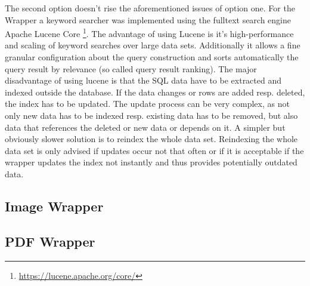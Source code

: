 The second option doesn't rise the aforementioned issues of option one. For the Wrapper a keyword searcher was implemented using the fulltext search engine Apache Lucene Core \footnote{\url{https://lucene.apache.org/core/}}. The advantage of using Lucene is it's high-performance and scaling of keyword searches over large data sets. Additionally it allows a fine granular configuration about the query construction and sorts automatically the query result by relevance (so called query result ranking). The major disadvantage of using lucene is that the SQL data have to be extracted and indexed outside the database. If the data changes or rows are added resp. deleted, the index has to be updated. The update process can be very complex, as not only new data has to be indexed resp. existing data has to be removed, but also data that references the deleted or new data or depends on it. A simpler but obviously slower solution is to reindex the whole data set. Reindexing the whole data set is only advised if updates occur not that often or if it is acceptable if the wrapper updates the index not instantly and thus provides potentially outdated data. 

\subsection{Image Wrapper}
\subsection{PDF Wrapper}
